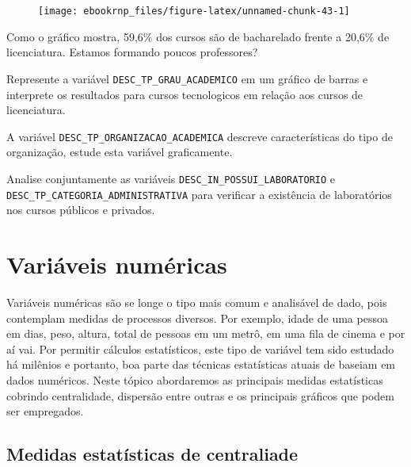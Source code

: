\documentclass[11pt,]{style/krantz}
\theoremstyle{definition}
\theoremstyle{definition}
\theoremstyle{definition}
\theoremstyle{remark}
\let\BeginKnitrBlock\begin \let\EndKnitrBlock\end
\begin{document}
\begin{figure}[H]

{\centering \texttt{[image: ebookrnp\_files/figure-latex/unnamed-chunk-43-1]} 

}

\end{figure}

Como o gráfico mostra, 59,6\% dos cursos são de bacharelado frente a 20,6\% de licenciatura. Estamos formando poucos professores?

\BeginKnitrBlock{exercise}
\protect\hypertarget{exr:unnamed-chunk-44}{}{\label{exr:unnamed-chunk-44} }Represente a variável \texttt{DESC\_TP\_GRAU\_ACADEMICO} em um gráfico de barras e interprete os resultados para cursos tecnologicos em relação aos cursos de licenciatura.
\EndKnitrBlock{exercise}

\BeginKnitrBlock{exercise}
\protect\hypertarget{exr:unnamed-chunk-45}{}{\label{exr:unnamed-chunk-45} }A variável \texttt{DESC\_TP\_ORGANIZACAO\_ACADEMICA} descreve características do tipo de organização, estude esta variável graficamente.
\EndKnitrBlock{exercise}

\BeginKnitrBlock{exercise}
\protect\hypertarget{exr:unnamed-chunk-46}{}{\label{exr:unnamed-chunk-46} }Analise conjuntamente as variáveis \texttt{DESC\_IN\_POSSUI\_LABORATORIO} e \texttt{DESC\_TP\_CATEGORIA\_ADMINISTRATIVA} para verificar a existência de laboratórios nos cursos públicos e privados.
\EndKnitrBlock{exercise}

\hypertarget{variaveis-numericas}{%
\section{Variáveis numéricas}\label{variaveis-numericas}}

Variáveis numéricas são se longe o tipo mais comum e analisável de dado, pois contemplam medidas de processos diversos. Por exemplo, idade de uma pessoa em dias, peso, altura, total de pessoas em um metrô, em uma fila de cinema e por aí vai. Por permitir cálculos estatísticos, este tipo de variável tem sido estudado há milênios e portanto, boa parte das técnicas estatísticas atuais de baseiam em dados numéricos. Neste tópico abordaremos as principais medidas estatísticas cobrindo centralidade, dispersão entre outras e os principais gráficos que podem ser empregados.

\hypertarget{medidas-estatisticas-de-centraliade}{%
\subsection{Medidas estatísticas de centraliade}\label{medidas-estatisticas-de-centraliade}}
\end{document}
